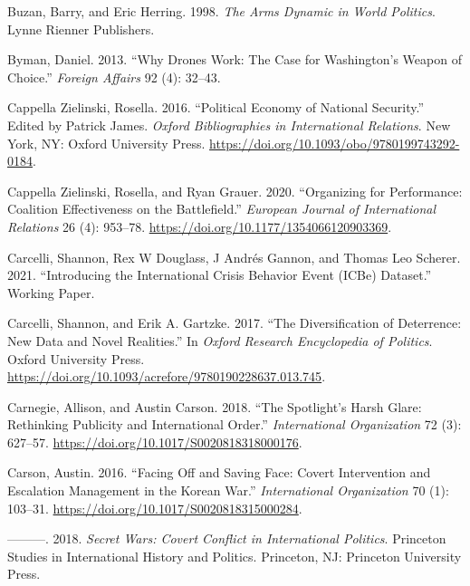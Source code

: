 \documentclass[
]{article}
\begin{document}
\leavevmode\hypertarget{ref-buzan_armsdynamicworld_1998}{}%
Buzan, Barry, and Eric Herring. 1998. \emph{The Arms Dynamic in World Politics}. Lynne Rienner Publishers.

\leavevmode\hypertarget{ref-byman_whydroneswork_2013}{}%
Byman, Daniel. 2013. ``Why Drones Work: The Case for Washington's Weapon of Choice.'' \emph{Foreign Affairs} 92 (4): 32--43.

\leavevmode\hypertarget{ref-cappellazielinski_politicaleconomynational_2016}{}%
Cappella Zielinski, Rosella. 2016. ``Political Economy of National Security.'' Edited by Patrick James. \emph{Oxford Bibliographies in International Relations}. New York, NY: Oxford University Press. \url{https://doi.org/10.1093/obo/9780199743292-0184}.

\leavevmode\hypertarget{ref-cappellazielinski_organizingperformancecoalition_2020}{}%
Cappella Zielinski, Rosella, and Ryan Grauer. 2020. ``Organizing for Performance: Coalition Effectiveness on the Battlefield.'' \emph{European Journal of International Relations} 26 (4): 953--78. \url{https://doi.org/10.1177/1354066120903369}.

\leavevmode\hypertarget{ref-carcelli_introducinginternationalcrisis_2021}{}%
Carcelli, Shannon, Rex W Douglass, J Andrés Gannon, and Thomas Leo Scherer. 2021. ``Introducing the International Crisis Behavior Event (ICBe) Dataset.'' Working Paper.

\leavevmode\hypertarget{ref-carcelli_diversificationdeterrencenew_2017}{}%
Carcelli, Shannon, and Erik A. Gartzke. 2017. ``The Diversification of Deterrence: New Data and Novel Realities.'' In \emph{Oxford Research Encyclopedia of Politics}. Oxford University Press. \url{https://doi.org/10.1093/acrefore/9780190228637.013.745}.

\leavevmode\hypertarget{ref-carnegie_spotlightharshglare_2018}{}%
Carnegie, Allison, and Austin Carson. 2018. ``The Spotlight's Harsh Glare: Rethinking Publicity and International Order.'' \emph{International Organization} 72 (3): 627--57. \url{https://doi.org/10.1017/S0020818318000176}.

\leavevmode\hypertarget{ref-carson_facingsavingface_2016}{}%
Carson, Austin. 2016. ``Facing Off and Saving Face: Covert Intervention and Escalation Management in the Korean War.'' \emph{International Organization} 70 (1): 103--31. \url{https://doi.org/10.1017/S0020818315000284}.

\leavevmode\hypertarget{ref-carson_secretwarscovert_2018}{}%
---------. 2018. \emph{Secret Wars: Covert Conflict in International Politics}. Princeton Studies in International History and Politics. Princeton, NJ: Princeton University Press.
\end{document}
